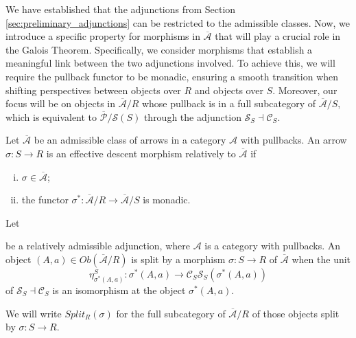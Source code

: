 We have established that the adjunctions from Section \ref{sec:preliminary_adjunctions} can be restricted to the admissible classes. Now, we introduce a specific property for morphisms in $\overline{\mathcal{A}}$ that will play a crucial role in the Galois Theorem. Specifically, we consider morphisms that establish a meaningful link between the two adjunctions involved. To achieve this, we will require the pullback functor to be monadic, ensuring a smooth transition when shifting perspectives between objects over $R$ and objects over $S$. Moreover, our focus will be on objects in $\overline{\mathcal{A}}/R$ whose pullback is in a full subcategory of $\overline{\mathcal{A}}/S$, which is equivalent to $\overline{\mathcal{P}}/\mathcal{S}(S)$ through the adjunction $\mathcal{S}_S\dashv\mathcal{C}_S$.
\begin{definition}
    Let $\overline{\mathcal{A}}$ be an admissible class of arrows in a category $\mathcal{A}$ with pullbacks. An arrow $\sigma:S\to R$ is an effective descent morphism relatively to $\overline{\mathcal{A}}$ if
    \begin{enumerate}[(i)]
        \item $\sigma\in\overline{\mathcal{A}}$;
        \item the functor $\sigma^*:\overline{\mathcal{A}}/R\longrightarrow\overline{\mathcal{A}}/S$ is monadic.
    \end{enumerate}
\end{definition}
\begin{definition}
\label{def:SplitObjectSigma}
    Let 
    be a relatively admissible adjunction, where $\mathcal{A}$ is a category with pullbacks. An object $(A,a)\in Ob(\overline{\mathcal{A}}/R)$ is split by a morphism $\sigma:S\to R$ of $\overline{\mathcal{A}}$ when the unit
    \[\eta_{\sigma^*(A,a)}^S:\sigma^*(A,a)\longrightarrow\mathcal{C}_S\mathcal{S}_S(\sigma^*(A,a))\]
    of $\mathcal{S}_S\dashv\mathcal{C}_S$ is an isomorphism at the object $\sigma^*(A,a)$.

    We will write $Split_R(\sigma)$ for the full subcategory of $\overline{\mathcal{A}}/R$ of those objects split by $\sigma:S\to R$.
\end{definition}
